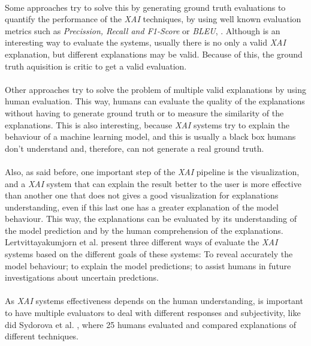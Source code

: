 \paragraph{}
Some approaches try to solve this by generating ground truth evaluations to quantify the performance of the \emph{XAI} techniques, by using well known evaluation metrics such as \emph{Precission, Recall and F1-Score}\cite{Carton2018} or \emph{BLEU}\cite{Ling2017}, \cite{Rajani2019}. Although is an interesting way to evaluate the systems, usually there is no only a valid \emph{XAI} explanation, but different explanations may be valid. Because of this, the ground truth aquisition is critic to get a valid evaluation.
\paragraph{}
Other approaches try to solve the problem of multiple valid explanations by using human evaluation. This way, humans can evaluate the quality of the explanations without having to generate ground truth or to measure the similarity of the explanations. This is also interesting, because \emph{XAI} systems try to explain the behaviour of a machine learning model, and this is usually a black box humans don't understand and, therefore, can not generate a real ground truth. 
\paragraph{}
Also, as said before, one important step of the \emph{XAI} pipeline is the visualization, and a \emph{XAI} system that can explain the result better to the user is more effective than another one that does not gives a good visualization for explanations understanding, even if this last one has a greater explanation of the model behaviour. This way, the explanations can be evaluated by its understanding of the model prediction and by the human comprehension of the explanations. Lertvittayakumjorn et al. \cite{Lertvittayakumjorn2019} present three different ways of evaluate the \emph{XAI} systems based on the different goals of these systems: To reveal accurately the model behaviour; to explain the model predictions; to assist humans in future investigations about uncertain predctions.
\paragraph{}
As \emph{XAI} systems effectiveness depends on the human understanding, is important to have multiple evaluators to deal with different responses and subjectivity, like did Sydorova et al. \cite{Sydorova2019}, where 25 humans evaluated and compared explanations of different techniques.
